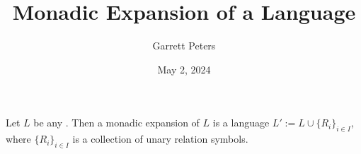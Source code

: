 \documentclass[a4paper]{article}
\title{Monadic Expansion of a Language}
\date{May 2, 2024}
\author{Garrett Peters}
\begin{document}
\maketitle
\par{Let \(L\) be any . Then a monadic expansion of \(L\) is a language \(L':= L \cup \{ R_i \} _{i \in  I}\), where \(\{ R_i \} _{i \in  I}\) is a collection of unary relation symbols.}
\printbibliography
\end{document}
